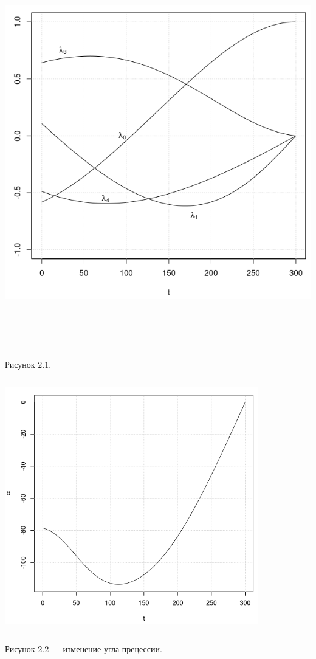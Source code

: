 \documentclass[14pt]{extreport}
\begin{document}
\begin{center}
\vspace*{50px}
\includegraphics[width=17cm, height=17cm]{l300.png}

Рисунок $2.1$. 
\end{center}

\begin{center}
\includegraphics[width=11cm, height=11cm]{alpha.png}

Рисунок $2.2$  --- изменение угла прецессии. 
\end{center}
\end{document}
